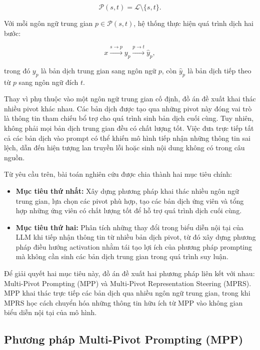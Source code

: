 \begin{equation}
	\mathcal{P}(s,t)
	=
	\mathcal{L}\setminus\{s,t\}.
\end{equation}

Với mỗi ngôn ngữ trung gian $p\in\mathcal{P}(s,t)$, hệ thống thực hiện quá trình dịch hai bước:

\begin{equation}
	x
	\xrightarrow{s\rightarrow p}
	y_p
	\xrightarrow{p\rightarrow t}
	\hat{y}_p,
\end{equation}

trong đó $y_p$ là bản dịch trung gian sang ngôn ngữ $p$, còn $\hat{y}_p$ là bản dịch tiếp theo từ $p$ sang ngôn ngữ đích $t$.

Thay vì phụ thuộc vào một ngôn ngữ trung gian cố định, đồ án đề xuất khai thác nhiều pivot khác nhau. Các bản dịch được tạo qua những pivot này đóng vai trò là thông tin tham chiếu bổ trợ cho quá trình sinh bản dịch cuối cùng. Tuy nhiên, không phải mọi bản dịch trung gian đều có chất lượng tốt. Việc đưa trực tiếp tất cả các bản dịch vào prompt có thể khiến mô hình tiếp nhận những thông tin sai lệch, dẫn đến hiện tượng lan truyền lỗi hoặc sinh nội dung không có trong câu nguồn.

Từ yêu cầu trên, bài toán nghiên cứu được chia thành hai mục tiêu chính:

\begin{itemize}
	\item \textbf{Mục tiêu thứ nhất:} Xây dựng phương pháp khai thác nhiều ngôn ngữ trung gian, lựa chọn các pivot phù hợp, tạo các bản dịch ứng viên và tổng hợp những ứng viên có chất lượng tốt để hỗ trợ quá trình dịch cuối cùng.
	
	\item \textbf{Mục tiêu thứ hai:} Phân tích những thay đổi trong biểu diễn nội tại của LLM khi tiếp nhận thông tin từ nhiều bản dịch pivot, từ đó xây dựng phương pháp điều hướng activation nhằm tái tạo lợi ích của phương pháp prompting mà không cần sinh các bản dịch trung gian trong quá trình suy luận.
\end{itemize}

Để giải quyết hai mục tiêu này, đồ án đề xuất hai phương pháp liên kết với nhau: Multi-Pivot Prompting (MPP) và Multi-Pivot Representation Steering (MPRS). MPP khai thác trực tiếp các bản dịch qua nhiều ngôn ngữ trung gian, trong khi MPRS học cách chuyển hóa những thông tin hữu ích từ MPP vào không gian biểu diễn nội tại của mô hình.

\subsection{Phương pháp Multi-Pivot Prompting (MPP)}

